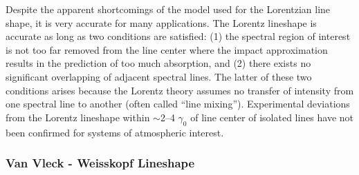 \documentclass[11pt]{article}
\begin{document}
Despite the apparent shortcomings of the model used for the Lorentzian line
shape, it is very accurate for many applications.  The Lorentz lineshape is
accurate as long as two conditions are satisfied: (1) the spectral
region of interest is not too far removed from the line center where the 
impact approximation results in the prediction of too much absorption, and 
(2) there exists no significant overlapping of adjacent 
spectral lines.  The latter of these
two conditions arises because the Lorentz theory assumes no transfer of
intensity from one spectral line to another (often called ``line mixing'').
Experimental deviations from the Lorentz lineshape within $\sim$2--4
$\gamma_0$ of line center of isolated lines have not been confirmed for
systems of atmospheric interest.

\subsubsection{Van Vleck - Weisskopf Lineshape}\label{sec:vvw}
\end{document}
